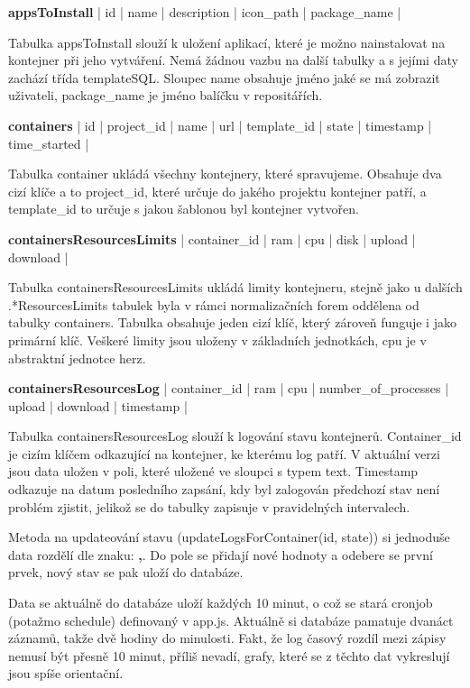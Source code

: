 \documentclass[a4paper,oneside,12pt]{report}
\begin{document}
\vspace{0.3cm}
\noindent
\textbf{appsToInstall} | id | name | description | icon\_path | package\_name |

Tabulka appsToInstall slouží k uložení aplikací, které je možno nainstalovat na kontejner při jeho vytváření.
Nemá žádnou vazbu na další tabulky a s jejími daty zachází třída templateSQL.
Sloupec name obsahuje jméno jaké se má zobrazit uživateli, package\_name je jméno balíčku v repositářích.

\vspace{0.3cm}
\noindent
\textbf{containers} | id | project\_id | name | url | template\_id | state | timestamp \linebreak[4] | time\_started |

Tabulka container ukládá všechny kontejnery, které spravujeme.
Obsahuje dva cizí klíče a to project\_id, které určuje do jakého projektu kontejner patří, a template\_id to určuje s jakou šablonou byl kontejner vytvořen.


\vspace{0.3cm}
\noindent
\textbf{containersResourcesLimits} | container\_id | ram | cpu | disk | upload | download |

Tabulka containersResourcesLimits ukládá limity kontejneru, stejně jako u dalších .*ResourcesLimits tabulek byla v rámci normalizačních forem oddělena od tabulky containers.
Tabulka obsahuje jeden cizí klíč, který zároveň funguje i jako primární klíč.
Veškeré limity jsou uloženy v základních jednotkách, cpu je v abstraktní jednotce herz.

\vspace{0.3cm}
\noindent
\textbf{containersResourcesLog} | container\_id | ram | cpu | number\_of\_processes | upload | download | timestamp |

Tabulka containersResourcesLog slouží k logování stavu kontejnerů.
Container\_id je cizím klíčem odkazující na kontejner, ke kterému log patří.
V aktuální verzi jsou data uložen v poli, které uložené ve sloupci s typem text.
Timestamp odkazuje na datum posledního zapsání, kdy byl zalogován předchozí stav není problém zjistit, jelikož se do tabulky zapisuje v pravidelných intervalech.

Metoda na updateování stavu (updateLogsForContainer(id, state)) si jednoduše data rozdělí dle znaku: \textbf{,}.
Do pole se přidají nové hodnoty a odebere se první prvek, nový stav se pak uloží do databáze.

Data se aktuálně do databáze uloží každých 10 minut, o což se stará cronjob (potažmo schedule) definovaný v app.js.
Aktuálně si databáze pamatuje dvanáct záznamů, takže dvě hodiny do minulosti.
Fakt, že log časový rozdíl mezi zápisy nemusí být přesně 10 minut, příliš nevadí, grafy, které se z těchto dat vykreslují jsou spíše orientační.
\end{document}
